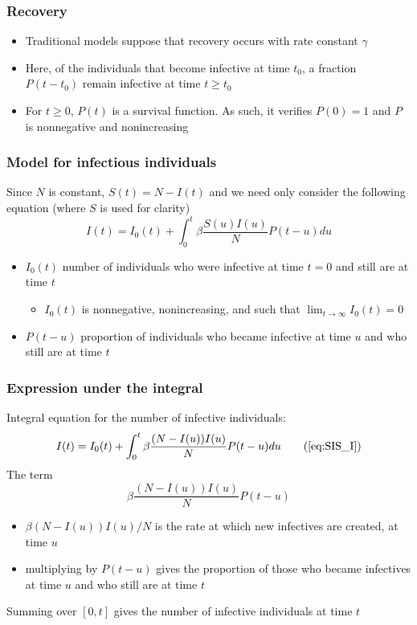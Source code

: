 \documentclass[aspectratio=169]{beamer}\usepackage[]{graphicx}\usepackage[]{xcolor}
\begin{document}
\begin{frame}\frametitle{Recovery}
\begin{itemize}
\item Traditional models suppose that recovery occurs with rate constant
$\gamma$
\vfill
\item Here, of the individuals that become
infective at time $t_0$, a fraction $P(t-t_0)$ remain infective at
time $t\geq t_0$
\vfill
\item \imply\;
For $t\geq 0$, $P(t)$ is a survival function. As such, it verifies
$P(0)=1$ and $P$ is nonnegative and nonincreasing
\end{itemize}
\end{frame}


\begin{frame}\frametitle{Model for infectious individuals}
Since $N$ is constant, $S(t)=N-I(t)$ and we need only
consider the following equation (where $S$ is used for clarity)
\begin{equation}
I(t) = I_0(t)+ \int_0^t\beta\frac{S(u)I(u)}{N} P(t-u) du
\label{eq:SIS_I} 
\end{equation}
\vfill
\begin{itemize}
\item $I_0(t)$ number of individuals who were infective at time
$t=0$ and still are at time $t$
\begin{itemize}
\item $I_0(t)$ is nonnegative, nonincreasing, and
such that $\lim_{t\to\infty}I_0(t)=0$
\end{itemize}
\item $P(t-u)$ proportion of individuals who became infective at time $u$ and who still are at time $t$
\end{itemize}
\end{frame}


\begin{frame}\frametitle{Expression under the integral}
Integral equation for the number of infective individuals: 
\begin{equation}
I(t) = I_0(t)+ \int_0^t\beta\frac{(N-I(u))I(u)}{N} P(t-u) du
\tag{\ref{eq:SIS_I}} 
\end{equation}
The term
\[
\beta\frac{(N-I(u))I(u)}{N} P(t-u)
\]
\begin{itemize}
\item $\beta (N-I(u))I(u)/N$ is the rate at which new infectives are created, at time $u$
\item multiplying by $P(t-u)$ gives the proportion of those who became
infectives at time $u$ and who still are at time $t$
\end{itemize}
Summing over $[0,t]$ gives the number of infective individuals at time $t$
\end{frame}
\end{document}
